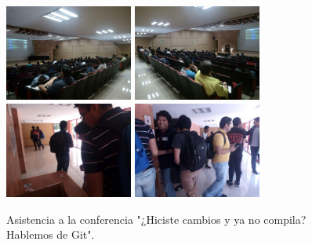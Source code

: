 \documentclass[a4paper,11pt]{article}                 %
\begin{document}
           \begin{figure}[H]
    \begin{center}
      \includegraphics[width=0.375\textwidth]{images/git-02}
      \includegraphics[width=0.375\textwidth]{images/git-03}
      \includegraphics[width=0.375\textwidth]{images/git-01}
      \includegraphics[width=0.375\textwidth]{images/git-04}
      \caption{Asistencia a la conferencia "¿Hiciste cambios y ya no compila? Hablemos de Git".}
      \label{fig:git}
    \end{center}
  \end{figure}  
  
\end{document}
